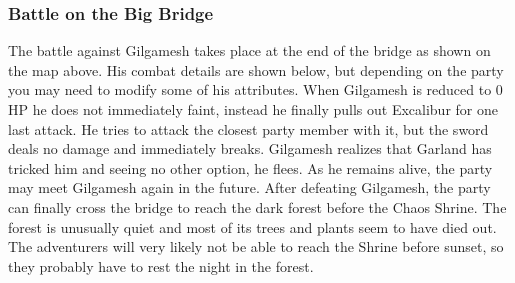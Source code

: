 \subsubsection*{Battle on the Big Bridge}
The battle against Gilgamesh takes place at the end of the bridge as shown on the map above.
His combat details are shown below, but depending on the party you may need to modify some of his attributes.
When Gilgamesh is reduced to 0 HP he does not immediately faint, instead he finally pulls out Excalibur for one last attack.
He tries to attack the closest party member with it, but the sword deals no damage and immediately breaks.
Gilgamesh realizes that Garland has tricked him and seeing no other option, he flees. 
As he remains alive, the party may meet Gilgamesh again in the future.
After defeating Gilgamesh, the party can finally cross the bridge to reach the dark forest before the Chaos Shrine.
The forest is unusually quiet and most of its trees and plants seem to have died out.
The adventurers will very likely not be able to reach the Shrine before sunset, so they probably have to rest the night in the forest.

\vspace{0.5cm}



\pagebreak